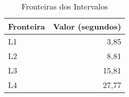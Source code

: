 \begin{table}[htbp]
\begin{center}
\begin{tabular}{|l|r|}
\hline
Fronteira & \multicolumn{1}{l|}{Valor (segundos)} \\ \hline
L1 & 3,85 \\ \hline
L2 & 8,81 \\ \hline
L3 & 15,81 \\ \hline
L4 & 27,77 \\ \hline
\end{tabular}
\end{center}
\caption{Fronteiras dos Intervalos }
\label{tab:tabela3}
\end{table}

